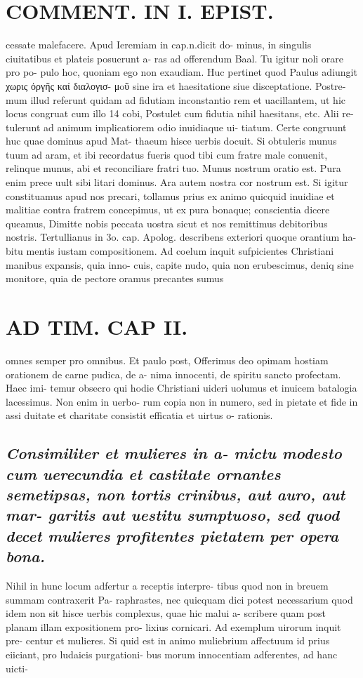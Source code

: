 \documentclass{article}
\begin{document}
\begin{pages}
\section*{COMMENT. IN I. EPIST. }\pstart cessate malefacere. Apud Ieremiam in cap.n.dicit do- minus, in singulis ciuitatibus et plateis posuerunt a- ras ad offerendum Baal. Tu igitur noli orare pro po- pulo hoc, quoniam ego non exaudiam. Huc pertinet quod Paulus adiungit χωρις ὀργῆς καί διαλογισ- μoῦ sine ira et haesitatione siue disceptatione. Postre- mum illud referunt quidam ad fidutiam inconstantio rem et uacillantem, ut hic locus congruat cum illo 14 cobi, Postulet cum fidutia nihil haesitans, etc. Alii re- tulerunt ad animum implicatiorem odio inuidiaque ui- tiatum. Certe congruunt huc quae dominus apud Mat- thaeum hisce uerbis docuit. Si obtuleris munus tuum ad aram, et ibi recordatus fueris quod tibi cum fratre male conuenit, relinque munus, abi et reconciliare fratri tuo. Munus nostrum oratio est. Pura enim prece uult sibi litari dominus. Ara autem nostra cor nostrum est. Si igitur constituamus apud nos precari, tollamus prius ex animo quicquid inuidiae et malitiae contra fratrem concepimus, ut ex pura bonaque; conscientia dicere queamus, Dimitte nobis peccata uostra sicut et nos remittimus debitoribus nostris. Tertullianus in 3o. cap. Apolog. describens exteriori quoque orantium ha- bitu mentis iustam compositionem. Ad coelum inquit sufpicientes Christiani manibus expansis, quia inno- cuis, capite nudo, quia non erubescimus, deniq sine monitore, quia de pectore oramus precantes sumus  \pend
\section*{AD TIM. CAP II. }
\marginpar{[ p.119 ]}\pstart omnes semper pro omnibus. Et paulo post, Offerimus deo opimam hostiam orationem de carne pudica, de a- nima innocenti, de spiritu sancto profectam. Haec imi- temur obsecro qui hodie Christiani uideri uolumus et inuicem batalogia lacessimus. Non enim in uerbo- rum copia non in numero, sed in pietate et fide in assi duitate et charitate consistit efficatia et uirtus o- rationis.  \pend 
{}
{}
\subsection*{\textit{Consimiliter et mulieres in a- mictu modesto cum uerecundia et castitate ornantes semetipsas, non tortis crinibus, aut auro, aut mar- garitis aut uestitu sumptuoso, sed quod decet mulieres profitentes pietatem per opera bona. }}\pstart Nihil in hunc locum adfertur a receptis interpre- tibus quod non in breuem summam contraxerit Pa- raphrastes, nec quicquam dici potest necessarium quod idem non sit hisce uerbis complexus, quae hic malui a- scribere quam post planam illam expositionem pro- lixius cornicari. Ad exemplum uirorum inquit pre- centur et mulieres. Si quid est in animo muliebrium affectuum id prius eiiciant, pro ludaicis purgationi- bus morum innocentiam adferentes, ad hanc uicti-  \pend

\end{pages}
\end{document}
